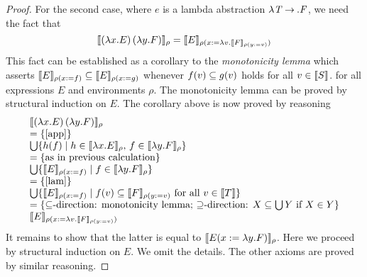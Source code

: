 \documentclass{llncs}
\newcommand{\Conid}[1]{\mathit{#1}}
\newcommand{\Varid}[1]{\mathit{#1}}
\newcommand*\hscompose[2]{#1}
\newcommand\hslambda{\global\let\hsarrow=\hsarrowperiodonce}
\newcommand*\hsarrowperiodonce[2]{#2\global\let\hsarrow=\hscompose}
\begin{document}
\begin{proof}
For the second case, where \ensuremath{\Varid{e}} is a lambda abstraction \ensuremath{\lambda \hslambda \Varid{y}\mathbin{:}\Conid{T}\hsarrow{\rightarrow }{\mathpunct{.}}\Conid{F}}, we need the fact that
\[\llbracket(\lambda x.E)\,(\lambda y.F)\rrbracket_{\rho} = \llbracket E\rrbracket_{\rho(x:= \lambda v.\llbracket F\rrbracket_{\rho(y:= v)})}\]
This fact can be established as a corollary to the \emph{monotonicity lemma} which asserts $\llbracket E\rrbracket_{\rho(x:=f)}\subseteq\llbracket E\rrbracket_{\rho(x:=g)}$ whenever $f(v) \subseteq g(v)$ holds for all $v\in\llbracket S\rrbracket$.
for all expressions \ensuremath{\Conid{E}} and environments \ensuremath{\rho }. The monotonicity lemma can be proved by structural induction on \ensuremath{\Conid{E}}.
The corollary above is now proved by reasoning
\[\begin{array}{l}
         \semr{(\lambda x.E)\,(\lambda y.F)}
\byref{app}
         \bigcup \{ h(f) \mid h \in \semr{\lambda x.E},\, f \in \semr{\lambda y.F} \}
\by{as in previous calculation}
         \bigcup \{ \seme{E}{\rho(x:=f)} \mid  f \in \semr{\lambda y. F}\}
\byref{lam}
         \bigcup \{ \seme{E}{\rho(x:=f)} \mid f(v)\sse\seme{F}{\rho(y:=v)} \text{ for all } v\in\sem{T}\}
\by{$\sse$-direction: monotonicity lemma; $\supseteq$-direction: $X\sse \bigcup Y$ if $X\in Y$}
         \seme{E}{\rho(x:= \lambda v.\seme{F}{\rho(y:= v)})}
\end{array}\]
It remains to show that the latter is equal to $\llbracket E(x:= \lambda y.F)\rrbracket_{\rho}$.
Here we proceed by structural induction on \ensuremath{\Conid{E}}. We omit the details. The other axioms are proved by similar reasoning.
\end{proof}


\end{document}
